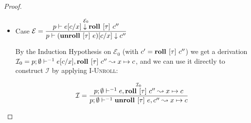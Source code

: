 \begin{proof}
\begin{itemize}
        $x$ must occur in either $e_1$ or $e_2$ or both. If $x$ occurs in $e_1$
        only, the Induction Hypothesis on $\mathcal{E}_0$ gives us a derivation
        $I_0 = \emptyinv e_1, c' \leadsto x \mapsto c$. Further, since $e_2$ by
        implication contains no free variables, by Lemma~\ref{thm:emptyinv} we
        have a derivation $\mathcal{I}_1 = p; x \mapsto c \vdash^{-1} e_2, c''
        \leadsto x \mapsto c$. By applying \textsc{I-Prod} with $\mathcal{I}_0$
        and $\mathcal{I}_1$ we have:

        \begin{align*}
          \mathcal{I} = \dfrac
            {\begin{array}{cc}
                \overset
                  {\mathcal{I}_0}
                  {\emptyinv e_1, c' \leadsto x \mapsto c} &
                \overset
                  {\mathcal{I}_1}
                  {p; x \mapsto c \vdash^{-1} e_2, c'' \leadsto x \mapsto c}
             \end{array}
            }
            {\emptyinv (e_1, e_2), (c', c'') \leadsto x \mapsto c}
        \end{align*}

        An analogous proof is valid for if only $e_2$ contains $x$. If both
        $e_1$ and $e_2$ contain $x$, the derivation of $\mathcal{I}_1$ must
        include an application of \textsc{I-Bind2} to show that the resulting
        store is in fact $x \mapsto c$.


    \item Case $\mathcal{E} =
      \dfrac
        {\overset
          {\mathcal{E}_0}
          {p \vdash e [c / x] \downarrow \textbf{roll } [\tau]\ c''}
        }
        {p \vdash (\textbf{unroll } [\tau]\ e) [c / x] \downarrow c''}$

        By the Induction Hypothesis on $\mathcal{E}_0$ (with $c' =
        \textbf{roll } [\tau]\ c''$) we get a derivation $\mathcal{I}_0 = p;\emptyset\vdash^{-1} e [c
        / x], \textbf{roll } [\tau]\ c'' \leadsto x \mapsto c$, and we can use it
        directly to construct $\mathcal{I}$ by applying \textsc{I-Unroll}:

        \begin{align*}
          \mathcal{I} = \dfrac
            {\overset
              {\mathcal{I}_0}
              {p;\emptyset\vdash^{-1} e, \textbf{roll } [\tau]\ c'' \leadsto x \mapsto c}
            }
            {p;\emptyset\vdash^{-1} \textbf{unroll } [\tau]\ e, c'' \leadsto x \mapsto c}
        \end{align*}


\end{itemize}
\end{proof}
